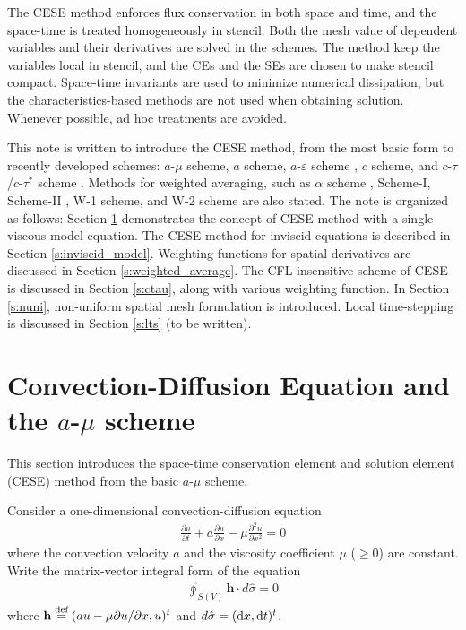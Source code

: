 \documentclass{turgon}
\begin{document}
The CESE method enforces flux conservation in both space and time, and the
space-time is treated homogeneously in stencil.  Both the mesh value of
dependent variables and their derivatives are solved in the schemes.  The
method keep the variables local in stencil, and the CEs and the SEs are chosen
to make stencil compact.  Space-time invariants are used to minimize numerical
dissipation, but the characteristics-based methods are not used when obtaining
solution.  Whenever possible, ad hoc treatments are avoided.
\citep{chang_method_1995}

This note is written to introduce the CESE method, from the most basic form to
recently developed schemes: $a$-$\mu$ scheme, $a$ scheme, $a$-$\varepsilon$
scheme \citep{chang_method_1995}, $c$ scheme, and $c$-$\tau$/$c$-$\tau^*$
scheme \citep{chang_multi-dimensional_2003}.  Methods for weighted averaging,
such as $\alpha$ scheme \citep{chang_method_1995}, Scheme-I,
Scheme-II \citep{chang_courant_2002}, W-1 scheme, and W-2
scheme \citep{chang_multi-dimensional_2003} are also stated.  The note is
organized as follows: Section \ref{s:cese_intro} demonstrates the concept of
CESE method with a single viscous model equation.  The CESE method for inviscid
equations is described in Section \ref{s:inviscid_model}.  Weighting functions
for spatial derivatives are discussed in Section \ref{s:weighted_average}.  The
CFL-insensitive scheme of CESE is discussed in Section \ref{s:ctau}, along with
various weighting function.  In Section \ref{s:nuni}, non-uniform spatial mesh
formulation is introduced.  Local time-stepping is discussed in Section
\ref{s:lts} (to be written).

\section{Convection-Diffusion Equation and the $a$-$\mu$ scheme}
\label{s:cese_intro}

This section introduces the space-time conservation element and solution
element (CESE) method from the basic $a$-$\mu$ scheme.

Consider a one-dimensional convection-diffusion equation
\begin{align}
    \frac{\partial u}{\partial t} + a\frac{\partial u}{\partial x}
  - \mu\frac{\partial^2u}{\partial x^2} = 0 \label{e:conv_diff_govern}
\end{align}
where the convection velocity $a$ and the viscosity coefficient $\mu$ ($\ge0$)
are constant.  Write the matrix-vector integral form of the equation
\begin{align}
  \oint_{S(V)}\mathbf{h}\cdot d\hat{\sigma}=0 \label{e:conservation}
\end{align}
where $\mathbf{h} \defeq (au-\mu\partial u/\partial x, u)^t$ and $d\hat{\sigma}
= (\mathop{}\!\mathrm{d} x, \mathop{}\!\mathrm{d} t)^t$.
\end{document}
